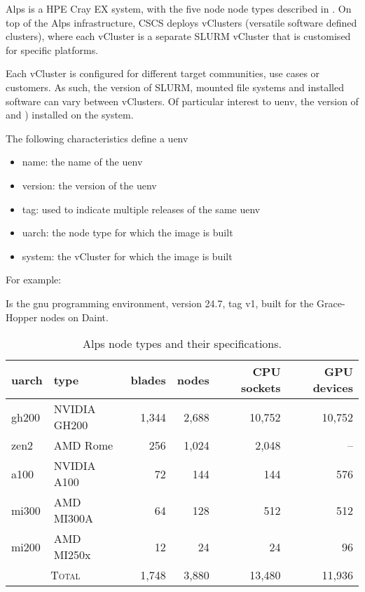 Alps is a HPE Cray EX system, with the five node node types described in .
On top of the Alps infrastructure, CSCS deploys vClusters (versatile software defined clusters), where each vCluster is a separate SLURM vCluster that is customised for specific platforms.

Each vCluster is configured for different target communities, use cases or customers.
As such, the version of SLURM, mounted file systems and installed software can vary between vClusters.
Of particular interest to uenv, the version of \xpmem and \libfabric) installed on the system.

The following characteristics define a uenv
\begin{itemize}
    \item name: the name of the uenv
    \item version: the version of the uenv
    \item tag: used to indicate multiple releases of the same uenv
    \item uarch: the node type for which the image is built
    \item system: the vCluster for which the image is built
\end{itemize}

For example: 

Is the gnu programming environment, version 24.7, tag v1, built for the Grace-Hopper nodes on Daint.

\begin{table*}[h!]
\centering
\begin{tabular}{llrrrr}
\toprule
uarch   & type         & blades & nodes & CPU sockets & GPU devices \\
\midrule
gh200   & NVIDIA GH200 & 1,344   & 2,688  & 10,752      & 10,752      \\
zen2    & AMD Rome     & 256     & 1,024  & 2,048       & --          \\
a100    & NVIDIA A100  & 72      & 144    & 144         & 576         \\
mi300   & AMD MI300A   & 64      & 128    & 512         & 512         \\
mi200   & AMD MI250x   & 12      & 24     & 24          & 96          \\
\midrule
\multicolumn{2}{c}{\textsc{Total}}      & 1,748   & 3,880  & 13,480  & 11,936 \\
\bottomrule
\end{tabular}
\caption{Alps node types and their specifications.}
\label{tab:alps-nodes}
\end{table*}

